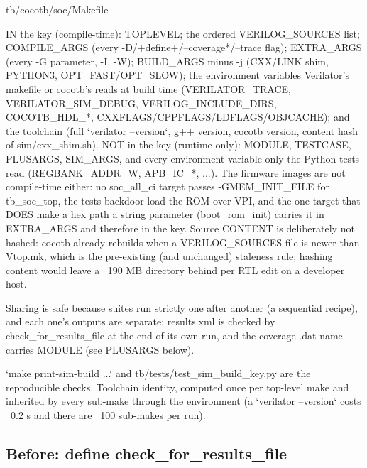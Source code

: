 \begin{relocated}{tb/cocotb/soc/Makefile}
\begin{textblock}
IN the key (compile-time): TOPLEVEL; the ordered VERILOG_SOURCES list; COMPILE_ARGS (every
  -D/+define+/--coverage*/--trace flag); EXTRA_ARGS (every -G parameter, -I, -W); BUILD_ARGS
  minus -j (CXX/LINK shim, PYTHON3, OPT_FAST/OPT_SLOW); the environment variables Verilator's
  makefile or cocotb's reads at build time (VERILATOR_TRACE, VERILATOR_SIM_DEBUG,
  VERILOG_INCLUDE_DIRS, COCOTB_HDL_*, CXXFLAGS/CPPFLAGS/LDFLAGS/OBJCACHE); and the toolchain
  (full `verilator --version`, g++ version, cocotb version, content hash of sim/cxx_shim.sh).
NOT in the key (runtime only): MODULE, TESTCASE, PLUSARGS, SIM_ARGS, and every environment
  variable only the Python tests read (REGBANK_ADDR_W, APB_IC_*, ...).  The firmware images are
  not compile-time either: no soc_all_ci target passes -GMEM_INIT_FILE for tb_soc_top, the tests
  backdoor-load the ROM over VPI, and the one target that DOES make a hex path a string
  parameter (boot_rom_init) carries it in EXTRA_ARGS and therefore in the key.
Source CONTENT is deliberately not hashed: cocotb already rebuilds when a VERILOG_SOURCES file
  is newer than Vtop.mk, which is the pre-existing (and unchanged) staleness rule; hashing
  content would leave a ~190 MB directory behind per RTL edit on a developer host.

Sharing is safe because suites run strictly one after another (a sequential recipe), and each
one's outputs are separate: results.xml is checked by check_for_results_file at the end of its
own run, and the coverage .dat name carries MODULE (see PLUSARGS below).

`make print-sim-build ...` and tb/tests/test_sim_build_key.py are the reproducible checks.
Toolchain identity, computed once per top-level make and inherited by every sub-make through
the environment (a `verilator --version` costs ~0.2 s and there are ~100 sub-makes per run).
\end{textblock}

\subsection*{Before: define check\_for\_results\_file}

\end{relocated}
